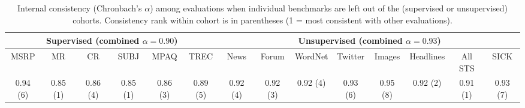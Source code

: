 \documentclass[11pt,letterpaper]{article}
\begin{document}
\hspace*{-2cm}
\begin{table*}[ht]
\begin{adjustwidth}{-1cm}{}
\renewcommand{\tabcolsep}{4.6pt}
\footnotesize
\begin{center}
      {
        \begin{tabular}{cccccc|cccccccc}
          \multicolumn{6}{c|}{Supervised (combined \(\alpha = 0.90\))} & \multicolumn{8}{c}{Unsupervised (combined \(\alpha = 0.93\))} \\
          \hline
                     MSRP & MR & CR & SUBJ & MPAQ & TREC & News & Forum & WordNet & Twitter & Images & Headlines & All STS  & SICK \\
                                          \footnotesize  0.94 (6) &	0.85 (1)	 &0.86 (4)	 &0.85 (1) &	0.86	(3) &0.89 (5) &	0.92	(4) &0.92 (3)	 &0.92 (4) &	0.93 (6)  &	0.95 (8)	 &0.92 (2)  &	0.91 (1)  &0.93 (7) \\
                                          \hline
        \end{tabular}
    }
    \caption{\label{consistency} Internal consistency (Chronbach's \(\alpha\)) among evaluations when individual benchmarks are left out of the (supervised or unsupervised) cohorts. Consistency rank within cohort is in parentheses (1 = most consistent with other evaluations).}
  \end{center}
  \vspace*{-4ex}
  \end{adjustwidth}
\end{table*}
\end{document}
